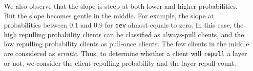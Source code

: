 We also observe that the slope is steep at both lower and higher probabilities.
But the slope becomes gentle in the middle.
For example, 
the slope at probabilities between 0.1 and 0.9 for \texttt{dev} almost equals to zero.
In this case,
the high repulling probability clients can be classified as always-pull clients, 
and the low repulling probability clients as pull-once clients. 
The few clients in the middle are considered as \emph{erratic}.
%
Thus,
to determine whether a client will \texttt{repull} a layer or not,
we consider the client repulling probability and the layer repull count.



